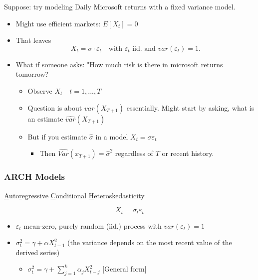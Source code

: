 Suppose: try modeling Daily Microsoft returns with a fixed variance model.
\begin{itemize}
    \item Might use efficient markets: $E[X_t]=0$
    \item That leaves \[
    X_t =\sigma \cdot \varepsilon_t \quad \text{with $\varepsilon_t$ iid. and $var(\varepsilon_t)=1$.}
    \]
    \item What if someone asks: "How much risk is there in microsoft returns tomorrow?
    \begin{itemize}
        \item Observe $X_t \quad t=1,...,T$
        \item Question is about $var(X_{T+1})$ essentially. Might start by asking, what is an estimate $\hat{var}(X_{T+1})$
        \item But if you estimate $\hat{\sigma}$ in a model $X_t=\sigma \varepsilon_t$ \begin{itemize}
            \item Then $\hat{Var}(x_{T+1})=\hat{\sigma}^2$ regardless of $T$ or recent history.
        \end{itemize}
    \end{itemize}
\end{itemize}


\subsubsection{ARCH Models}
\underline{A}uto\underline{r}egressive \underline{C}onditional \underline{H}eteroskedasticity 

\[X_t= \sigma_t \varepsilon_t\]
\begin{itemize}
    \item $\varepsilon_t$ mean-zero, purely random (iid.) process with $var(\varepsilon_t)=1$
    \item $\sigma_t^2=\gamma +\alpha X_{t-1}^2$ \quad (the variance depends on the most recent value of the derived series) 
    \begin{itemize}
        \item $\sigma_t^2 = \gamma + \sum_{j=1}^k \alpha_j X_{t-j}^2$ [General form]
    \end{itemize}
\end{itemize}

